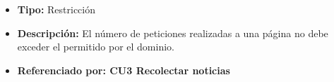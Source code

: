 
\begin{itemize}
  \item \textbf{Tipo:} Restricción
  \item \textbf{Descripción:} El número de peticiones realizadas a una página no debe exceder el permitido por el dominio.
  \item \textbf{Referenciado por: CU3 Recolectar noticias} \\
\end{itemize}
